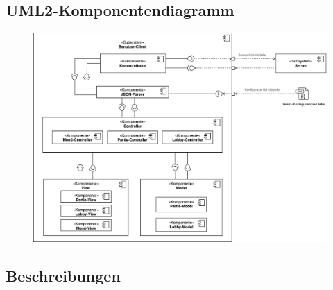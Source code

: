 \subsection{UML2-Komponentendiagramm}
    \begin{center}
        \begin{figure}[H]
            \centering
            \includegraphics[scale=0.13]{images/komponentendiagramm_benutzer-client.png}
        \end{figure}
    \end{center}
    
\subsection{Beschreibungen}

